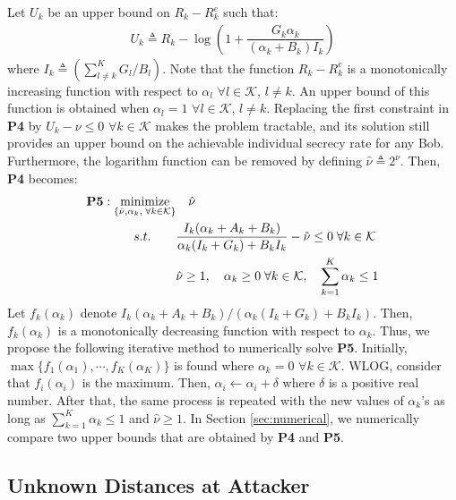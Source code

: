 \documentclass[draftclsnofoot, 12pt, onecolumn, journal]{IEEEtran}
\begin{document}
%
Let $U_k$ be an upper bound on $R_k - R_k^e$ such that:
%
\begin{align}
U_k \triangleq R_k - \log \left( 1 +  \dfrac{G_k \alpha_k}{ (\alpha_k + B_k) I_k } \right)
\end{align}
%
where $ I_k \triangleq ( \sum_{l \neq k}^K G_l / B_l) $.
Note that the function $ R_k - R_k^e$ is a monotonically increasing function with respect to $\alpha_l$ $\forall l \in \mathcal{K}$, $l \neq k$.
An upper bound of this function is obtained when $\alpha_l = 1$ $\forall l \in \mathcal{K}$, $l \neq k$.
Replacing the first constraint in \textbf{P4} by $U_k - \nu \leq 0$ $\forall k \in \mathcal{K}$ makes the problem tractable, and its solution still provides an upper bound on the achievable individual secrecy rate for any Bob.
Furthermore, the logarithm function can be removed by defining $ \hat{\nu} \triangleq 2^{\nu}$. 
Then, \textbf{P4} becomes:
%
\begin{align*}
\textbf{P5}:
\underset{ 
\begin{subarray} \\ 
\{ \hat{\nu}, \alpha_k,  \; \forall k \in \mathcal{K} \}
\end{subarray} }
{\text{minimize}} 
& \quad \hat{\nu} \\
 s.t. \quad \quad & \dfrac{I_k (\alpha_k + A_k + B_k)}{\alpha_k(I_k + G_k) + B_k I_k} - \hat{\nu} \leq 0 \; \forall k \in \mathcal{K} \\
& \hat{\nu} \geq 1, \quad \alpha_k \geq 0  \; \forall k \in \mathcal{K}, \quad \sum_{k=1}^K \alpha_k \leq 1
\end{align*}
%
Let $ f_k(\alpha_k) $ denote $ I_k (\alpha_k + A_k + B_k) /( \alpha_k(I_k + G_k) + B_k I_k ) $.
Then, $f_k(\alpha_k)$ is a monotonically decreasing function with respect to $\alpha_k$.
Thus, we propose the following iterative method to numerically solve \textbf{P5}.
Initially, $\max \{ f_1(\alpha_1), \cdots, f_K(\alpha_K) \}$ is found where $\alpha_k = 0$ $\forall k \in \mathcal{K}$.
WLOG, consider that $f_i(\alpha_i)$ is the maximum. 
Then, $\alpha_i \leftarrow \alpha_i + \delta$ where $\delta$ is a positive real number.
After that, the same process is repeated with the new values of $\alpha_k$'s as long as $\sum_{k=1}^K \alpha_k \leq 1$ and $\hat{\nu} \geq 1$.
In Section \ref{sec:numerical}, we numerically compare two upper bounds that are obtained by \textbf{P4} and \textbf{P5}.

\subsection{Unknown Distances at Attacker}
\end{document}
